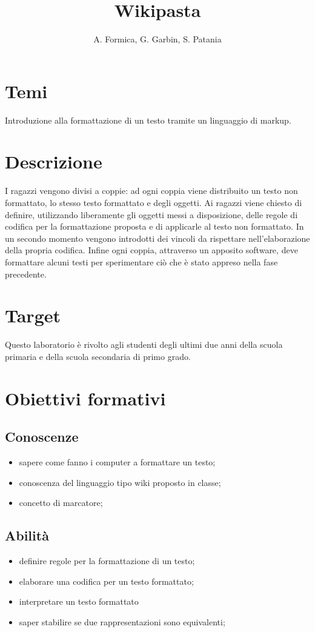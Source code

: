 \documentclass[12pt]{article}
\title{Wikipasta}
\author{A. Formica, G. Garbin, S. Patania}
\begin{document}
\maketitle
%
% 
\section{Temi}
Introduzione alla formattazione di un testo tramite un linguaggio di markup.
%
%
\section{Descrizione}
I ragazzi vengono divisi a coppie: ad ogni coppia viene distribuito un testo non formattato, lo stesso testo formattato e degli oggetti. Ai ragazzi viene chiesto di definire, utilizzando liberamente gli oggetti messi a disposizione, delle regole di codifica per la formattazione proposta e di applicarle al testo non formattato. In un secondo momento vengono introdotti dei vincoli da rispettare nell’elaborazione della propria codifica. Infine ogni coppia, attraverso un apposito software, deve formattare alcuni testi per sperimentare ciò che è stato appreso nella fase precedente.
%
%
\section{Target}
Questo laboratorio è rivolto agli studenti degli ultimi due anni della scuola primaria e della scuola secondaria di primo grado.
%
%
\section{Obiettivi formativi}
\subsection{Conoscenze}
\begin{itemize}
\item sapere come fanno i computer a formattare un testo;
\item conoscenza del linguaggio tipo wiki proposto in classe;
\item concetto di marcatore;
\end{itemize}

\subsection{Abilità}
\begin{itemize}
\item definire regole per la formattazione di un testo;
\item elaborare una codifica per un testo formattato;
\item interpretare un testo formattato
\item saper stabilire se due rappresentazioni sono equivalenti;
\end{itemize}
\end{document}
